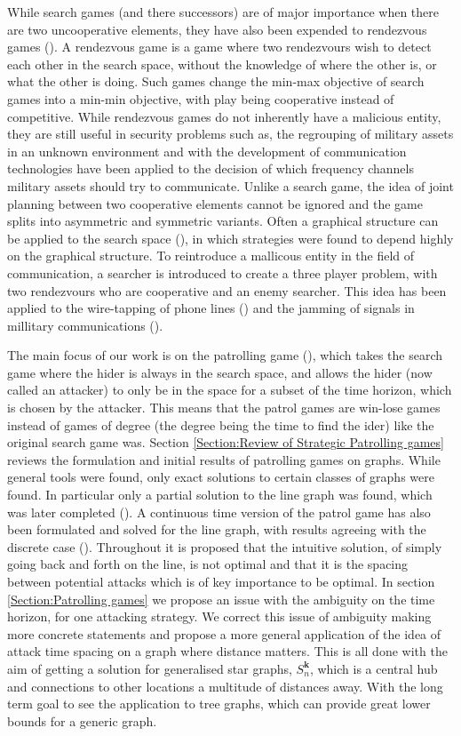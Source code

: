 \documentclass[a4paper,10pt]{article}
\theoremstyle{definition}
\theoremstyle{definition}
\theoremstyle{remark}
\theoremstyle{definition}
\begin{document}
While search games (and there successors) are of major importance when there are two uncooperative elements, they have also been expended to rendezvous games (\cite{Steve2003}). A rendezvous game is a game where two rendezvours wish to detect each other in the search space, without the knowledge of where the other is, or what the other is doing. Such games change the min-max objective of search games into a min-min objective, with play being cooperative instead of competitive. While rendezvous games do not inherently have a malicious entity, they are still useful in security problems such as, the regrouping of military assets in an unknown environment and with the development of communication technologies have been applied to the decision of which frequency channels military assets should try to communicate. Unlike a search game, the idea of joint planning between two cooperative elements cannot be ignored and the game splits into asymmetric and symmetric variants. Often a graphical structure can be applied to the search space (\cite{Alpern1999}), in which strategies were found to depend highly on the graphical structure. To reintroduce a mallicous entity in the field of communication, a searcher is introduced to create a three player problem, with two rendezvours who are cooperative and an enemy searcher. This idea has been applied to the wire-tapping of phone lines (\cite{Alpern1998}) and the jamming of signals in millitary communications (\cite{Abdel-Rahman2014}).

The main focus of our work is on the patrolling game (\citep{Alpern2011}), which takes the search game where the hider is always in the search space, and allows the hider (now called an attacker) to only be in the space for a subset of the time horizon, which is chosen by the attacker. This means that the patrol games are win-lose games instead of games of degree (the degree being the time to find the ider) like the original search game was. Section \ref{Section:Review of Strategic Patrolling games} reviews the formulation and initial results of patrolling games on graphs. While general tools were found, only exact solutions to certain classes of graphs were found. In particular only a partial solution to the line graph was found, which was later completed (\cite{Papadaki2016}). A continuous time version of the patrol game has also been formulated and solved for the line graph, with results agreeing with the discrete case (\cite{Alpern2016}). Throughout it is proposed that the intuitive solution, of simply going back and forth on the line, is not optimal and that it is the spacing between potential attacks which is of key importance to be optimal. In section \ref{Section:Patrolling games} we propose an issue with the ambiguity on the time horizon, for one attacking strategy. We correct this issue of ambiguity making more concrete statements and propose a more general application of the idea of attack time spacing on a graph where distance matters. This is all done with the aim of getting a solution for generalised star graphs, $S_{n}^{\bm{k}}$, which is a central hub and connections to other locations a multitude of distances away. With the long term goal to see the application to tree graphs, which can provide great lower bounds for a generic graph.
\end{document}
